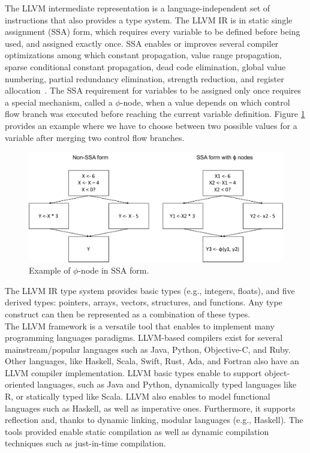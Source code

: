 The LLVM intermediate representation is a language-independent set of instructions that also provides a type system.
The LLVM IR is in static single assignment (SSA) form, which requires every variable to be defined before being used, and assigned exactly once. 
SSA enables or improves several compiler optimizations among which constant propagation, value range propagation, sparse conditional constant propagation, dead code elimination, global value numbering, partial redundancy elimination, strength reduction, and register allocation~\cite{appel1998ssa}.
The SSA requirement for variables to be assigned only once requires a special mechanism, called a $\phi$-node, when a value depends on which control flow branch was executed before reaching the current variable definition.
Figure \ref{SSA example} provides an example where we have to choose between two possible values for a variable after merging two control flow branches.\\

\begin{figure}[h]
\centering
\includegraphics[scale=0.5]{Figures/SSAForm}
\decoRule
\caption[SSA example]{Example of $\phi$-node in SSA form.}
\label{SSA example}
\end{figure}

The LLVM IR type system provides basic types (e.g., integers, floats), and five derived types: pointers, arrays, vectors, structures, and functions.
Any type construct can then be represented as a combination of these types.\\

The LLVM framework is a versatile tool that enables to implement many programming languages paradigms.
LLVM-based compilers exist for several mainstream/popular languages such as Java, Python, Objective-C, and Ruby.
Other languages, like Haskell, Scala, Swift, Rust, Ada, and Fortran also have an LLVM compiler implementation.
LLVM basic types enable to support object-oriented languages, such as Java and Python, dynamically typed languages like R, or statically typed like Scala.
LLVM also enables to model functional languages such as Haskell, as well as imperative ones. 
Furthermore, it supports reflection and, thanks to dynamic linking, modular languages (e.g., Haskell).
The tools provided enable static compilation as well as dynamic compilation techniques such as just-in-time compilation.\\


